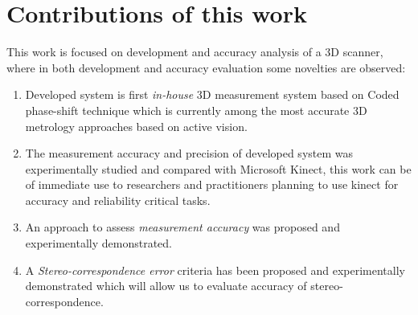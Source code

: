 \section{Contributions of this work}
This work is focused on development and accuracy analysis of a 3D scanner, where in both development and accuracy evaluation some novelties are observed:
\begin{enumerate}
\item Developed system is first \textit{in-house} 3D measurement system based on Coded phase-shift technique which is currently among the most accurate 3D metrology approaches based on active vision.

\item The measurement accuracy and precision of developed system  was experimentally studied and compared with Microsoft Kinect, this work can be of immediate use to researchers and practitioners planning to use kinect for accuracy and reliability critical tasks. 

\item An approach to assess \textit{measurement accuracy} was proposed and experimentally demonstrated.  

\item A \textit{Stereo-correspondence error} criteria has been proposed and experimentally demonstrated which will allow us to evaluate accuracy of stereo-correspondence.   
\end{enumerate}

